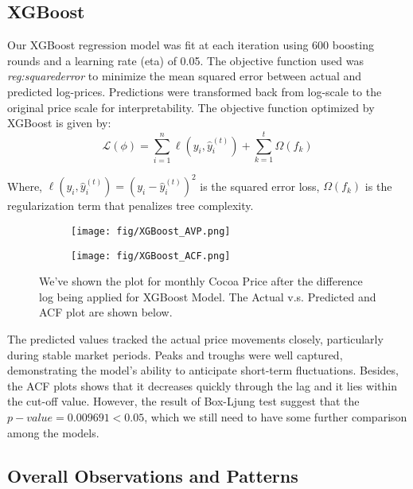 \documentclass[10pt]{article}
\begin{document}
\subsection{XGBoost}
Our XGBoost regression model was fit at each iteration using 600 boosting rounds and a learning rate (eta) of 0.05. The objective function used was \emph{reg:squarederror} to minimize the mean squared error between actual and predicted log-prices. Predictions were transformed back from log-scale to the original price scale for interpretability. The objective function optimized by XGBoost is given by:
\begin{equation*}
    \mathcal{L}(\phi) = \sum_{i=1}^{n} \ell\left(y_i, \hat{y}_i^{(t)}\right) + \sum_{k=1}^{t} \Omega(f_k)
\end{equation*}

\noindent
Where, $\ell\left(y_i, \hat{y}_i^{(t)}\right) = \left(y_i - \hat{y}_i^{(t)}\right)^2$ is the squared error loss, $\Omega(f_k)$ is the regularization term that penalizes tree complexity.

\begin{figure}[h!]
    \captionsetup{font=scriptsize}
    \centering
    \begin{subfigure}[b]{0.45\textwidth}
        \centering
        \texttt{[image: fig/XGBoost\_AVP.png]}
        \label{fig:m5_c2}
    \end{subfigure}
    \begin{subfigure}[b]{0.45\textwidth}
        \centering
        \texttt{[image: fig/XGBoost\_ACF.png]}
        \label{fig:m5_qq}
    \end{subfigure}
    \caption{We've shown the plot for monthly Cocoa Price after the difference log being applied for XGBoost Model. The Actual v.s. Predicted and ACF plot are shown below.}
    \label{fig:diff_lof}
\end{figure}

\noindent
The predicted values tracked the actual price movements closely, particularly during stable market periods. Peaks and troughs were well captured, demonstrating the model’s ability to anticipate short-term fluctuations. Besides, the ACF plots shows that it decreases quickly through the lag and it lies within the cut-off value. However, the result of Box-Ljung test suggest that the $p-value = 0.009691 < 0.05$, which we still need to have some further comparison among the models. 

\subsection{Overall Observations and Patterns}
\end{document}
